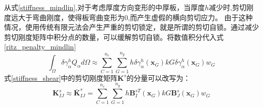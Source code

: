从式\eqref{stiffness_mindlin},对于考虑厚度方向变形的中厚板，当厚度$h$减少时,剪切刚度远大于弯曲刚度，使得板弯曲变形为$0$,而产生虚假的横向剪切应力。
由于这种情况，使用传统有限元法会产生严重的剪切锁定，就是所谓的剪切自锁。通过减少剪切刚度矩阵中积分点的数量，可以缓解剪切自锁。将数值积分代入式\eqref{ritz_penalty_mindlin}
\begin{equation}
    \int_{\Omega}\delta\gamma^h_{\alpha}Q_{\alpha}d\Omega \approx
    \sum_{C=1}^{n_e}\sum_{G=1}^{n_g} h \delta\gamma^h_{\alpha}(\boldsymbol x_G) kG \delta\gamma^h_{\alpha}(\boldsymbol x_G) w_G
\end{equation}
式\eqref{stiffness_shear}中的剪切刚度矩阵$\boldsymbol K^s$的分量可以改写为：
\begin{equation}
    \boldsymbol K^s_{IJ} \approx \bar{\boldsymbol K}^s_{IJ} = \sum_{C=1}^{n_e}\sum_{G=1}^{n_g} h\boldsymbol B^{sT}_I(\boldsymbol x_G) kG\boldsymbol B_J^s(\boldsymbol x_G) w_G
\end{equation}

